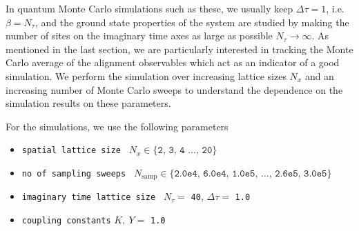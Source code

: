 \documentclass[../thesis_main.tex]{subfiles}
\begin{document}
In quantum Monte Carlo simulations such as these, we usually keep $\Delta \tau = 1$, i.e. $\beta = N_\tau$, and the ground state properties of the system are studied by making the number of sites on the imaginary time axes as large as possible $N_\tau \to \infty$. As mentioned in the last section, we are particularly interested in tracking the Monte Carlo average of  the alignment observables which act as an indicator of a good simulation. We perform the simulation over increasing lattice sizes $N_x$ and an increasing number of Monte Carlo sweeps to understand the dependence on the simulation results on these parameters.

For the simulations, we use the following parameters
\begin{itemize}[label={}]
    \setlength{\itemsep}{0.1em}
    \item \texttt{spatial lattice size } $N_x \in \{ \texttt{2, 3, 4 $\ldots$, 20} \}$  
    \item \texttt{no of sampling sweeps } $N_\text{samp} \in \{\texttt{2.0e4, 6.0e4, 1.0e5, $\ldots$, 2.6e5, 3.0e5} \}$
    \item \texttt{imaginary time lattice size } $N_\tau = $ \texttt{40}, \: $\Delta \tau = $ \texttt{1.0}
    \item \texttt{coupling constants} $K,\: Y = $ \texttt{1.0}
\end{itemize}
\end{document}
